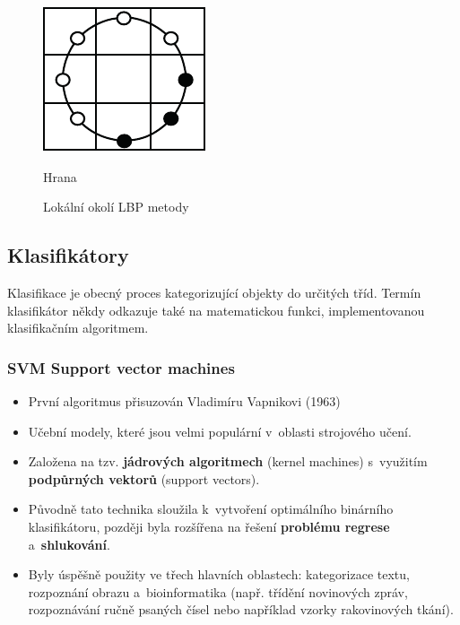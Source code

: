\begin{figure}[H]
\begin{minipage}[b]{.18\textwidth}
  \includegraphics[width=.9\linewidth]{assets/9_lbp_edge}
  \caption*{Hrana}
\end{minipage}
\caption{Lokální okolí LBP metody}
\label{fig:lbpvzory}
\end{figure}

\subsection{Klasifikátory}
Klasifikace je obecný proces kategorizující objekty do určitých tříd. Termín klasifikátor někdy odkazuje také na matematickou funkci, implementovanou klasifikačním algoritmem.
\subsubsection*{SVM Support vector machines} %
\begin{itemize}
  \item První algoritmus přisuzován Vladimíru Vapnikovi (1963)
  \item Učební modely, které jsou velmi populární v~oblasti strojového učení.
  \item Založena na tzv. \textbf{jádrových algoritmech} (kernel machines) s~využitím \textbf{podpůrných vektorů} (support vectors).
  \item Původně tato technika sloužila k~vytvoření optimálního binárního klasifikátoru, později byla rozšířena na řešení \textbf{problému regrese} a~\textbf{shlukování}.
  \item Byly úspěšně použity ve třech hlavních oblastech: kategorizace textu, rozpoznání obrazu a~bioinformatika (např. třídění novinových zpráv, rozpoznávání ručně psaných čísel nebo například vzorky rakovinových tkání).
\end{itemize}

